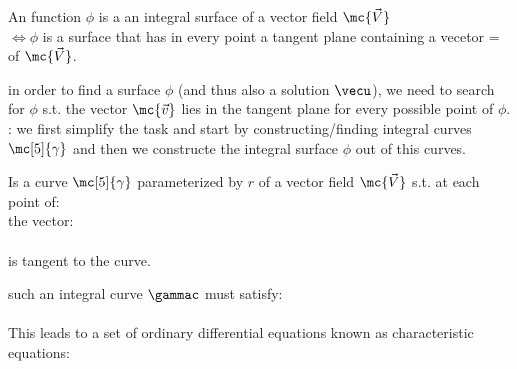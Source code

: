 \begin{defnbox}
    \begin{defn}\label{Integral Surface}
        An function $\phi$ is a an integral surface of a vector field $\mc{\vec{V}}$\\
        $\iff\phi$ is a surface that has in every point a tangent plane containing a vecetor = of $\mc{\vec{V}}$.
    \end{defn}
\end{defnbox}
\begin{sectionbox}
\begin{figure}
\end{figure}
 in order to find a surface $\phi$ (and thus also a solution $\vecu$), we need to search for $\phi$ s.t.
the vector $\mc{\vec{v}}$ lies in the tangent plane for every possible point of $\phi$.\\
: we first simplify the task and start by constructing/finding integral curves $\mc[5]{\gamma}$ and
then we constructe the integral surface $\phi$ out of this curves.
\end{sectionbox}
\begin{defnbox}
    \begin{defn}\label{Integral Curve}
        Is a curve $\mc[5]{\gamma}$ parameterized by $r$ of a vector field $\mc{\vec{V}}$ s.t. at each point of:\\
        the vector:\\
        \\
        is tangent to the curve.
    \end{defn}
\end{defnbox}
\begin{sectionbox}
 such an integral curve $\gammac$ must satisfy:\\
\\
This leads to a set of ordinary differential equations known as characteristic equations:
\end{sectionbox}
